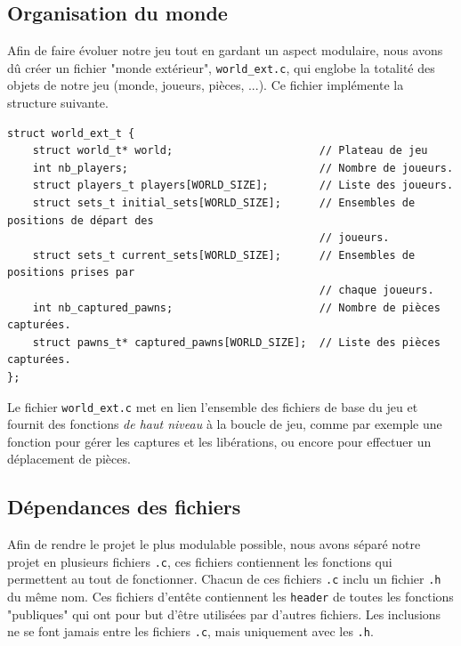     \subsection{Organisation du monde}\label{part:world_ext}
        Afin de faire évoluer notre jeu tout en gardant un aspect modulaire, nous avons dû créer un fichier "monde extérieur", \texttt{world\_ext.c}, qui englobe la totalité des objets de notre jeu (monde, joueurs, pièces, ...).  Ce fichier implémente la structure suivante.

        \begin{lstlisting}
struct world_ext_t {
	struct world_t* world;                       // Plateau de jeu
	int nb_players;                              // Nombre de joueurs.
	struct players_t players[WORLD_SIZE];        // Liste des joueurs.
	struct sets_t initial_sets[WORLD_SIZE];      // Ensembles de positions de départ des
                                                 // joueurs.
	struct sets_t current_sets[WORLD_SIZE];      // Ensembles de positions prises par
                                                 // chaque joueurs.
	int nb_captured_pawns;                       // Nombre de pièces capturées.
	struct pawns_t* captured_pawns[WORLD_SIZE];  // Liste des pièces capturées.
};\end{lstlisting}

    Le fichier \texttt{world\_ext.c} met en lien l'ensemble des fichiers de base du jeu et fournit des fonctions \textit{de haut niveau} à la boucle de jeu, comme par exemple une fonction pour gérer les captures et les libérations, ou encore pour effectuer un déplacement de pièces.
    
    \subsection{Dépendances des fichiers}\label{part:graph_src}
        Afin de rendre le projet le plus modulable possible, nous avons séparé notre projet en plusieurs fichiers \texttt{.c}, ces fichiers contiennent les fonctions qui permettent au tout de fonctionner. Chacun de ces fichiers \texttt{.c} inclu un fichier \texttt{.h} du même nom. Ces fichiers d'entête contiennent les \texttt{header} de toutes les fonctions "publiques" qui ont pour but d'être utilisées par d'autres fichiers. Les inclusions ne se font jamais entre les fichiers \texttt{.c}, mais uniquement avec les \texttt{.h}.
        
